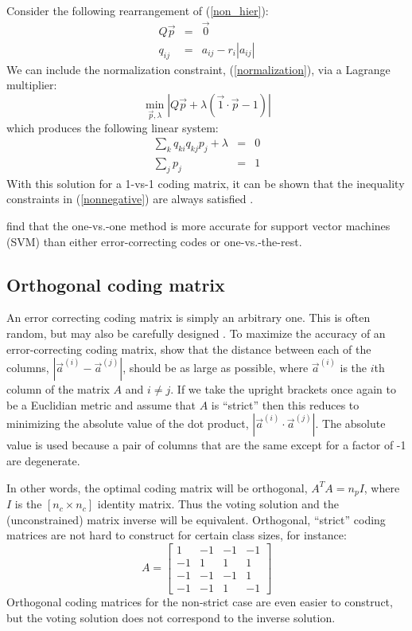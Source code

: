 \documentclass{article}
\begin{document}
Consider the following rearrangement of (\ref{non_hier}):
\begin{eqnarray}
	Q \vec p & = & \vec 0 \\
	q_{ij} & = & a_{ij} - r_i |a_{ij}|
\end{eqnarray}
We can include the normalization constraint, (\ref{normalization}), via
a Lagrange multiplier:
\begin{equation}
	\min_{\vec p, \lambda} | Q \vec p + \lambda(\vec 1 \cdot \vec p - 1)|
\end{equation}
which produces the following linear system:
\begin{eqnarray}
	\sum_k q_{ki} q_{kj} p_j + \lambda & = & 0 \\
	\sum_j p_j & = & 1
\end{eqnarray}
With this solution for a 1-vs-1 coding matrix, it can be shown that the
inequality constraints in (\ref{nonnegative}) are always satisfied
\citep{Wu_etal2004}.

\citet{Hsu_Lin2002} find that the one-vs.-one method is more accurate
for support vector machines (SVM) than either
error-correcting codes or one-vs.-the-rest.

\subsection{Orthogonal coding matrix}

\label{orthogonal}

An error correcting coding matrix is simply an arbitrary one.
This is often random, but may also be carefully designed 
\citep{Crammer_Singer2002}.
To maximize the accuracy of an error-correcting coding matrix, 
\citep{Allwein_etal2000, Windeatt_Ghaderi2002} show that
the distance between each of the columns, $| \vec a^{(i)} - \vec a^{(j)} |$, 
should be as large as possible,
where $\vec a^({i})$ is the $i$th column of the matrix $A$ and $i \ne j$. 
If we take the upright brackets once again to be a
Euclidian metric and assume that $A$ is ``strict'' then this 
reduces to minimizing the absolute value of the dot product,
$|\vec a^{(i)} \cdot \vec a^{(j)}|$.
The absolute value is used because a pair of columns that are the same except 
for a factor of -1 are degenerate.

In other words, 
the optimal coding matrix will be orthogonal, $A^T A = n_p I$, where $I$ is
the $[n_c\times n_c]$ identity matrix. 
Thus the voting solution and the (unconstrained) matrix 
inverse will be equivalent. Orthogonal, ``strict'' coding matrices 
are not hard to construct for certain class sizes, for instance:
\begin{equation}
A = 
\begin{bmatrix}
1 & -1 & -1 & -1 \\
-1 & 1 & 1 & 1 \\
-1 & -1 & -1 & 1 \\
-1 & -1 & 1 & -1
\end{bmatrix}
\end{equation}
Orthogonal coding matrices for the non-strict case are even easier to
construct, but the voting solution does not correspond to the inverse solution.
\end{document}
